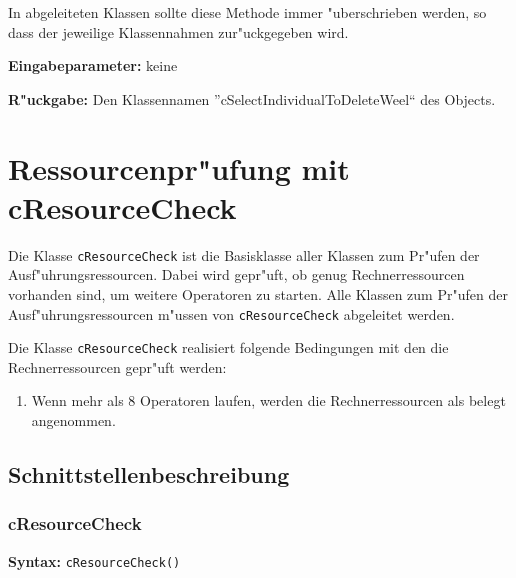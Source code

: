 In abgeleiteten Klassen sollte diese Methode immer "uberschrieben werden, so dass der jeweilige Klassennahmen zur"uckgegeben wird.

\bigskip\noindent
\textbf{Eingabeparameter:} keine

\bigskip\noindent
\textbf{R"uckgabe:} Den Klassennamen ''cSelectIndividualToDeleteWeel`` des Objects.


\section{Ressourcenpr"ufung mit cResourceCheck}
\label{secResourceCheck}

Die Klasse \verb|cResourceCheck| ist die Basisklasse aller Klassen zum Pr"ufen der Ausf"uhrungsressourcen. Dabei wird gepr"uft, ob genug Rechnerressourcen vorhanden sind, um weitere Operatoren zu starten. Alle Klassen zum  Pr"ufen der Ausf"uhrungsressourcen m"ussen von \verb|cResourceCheck| abgeleitet werden.


Die Klasse \verb|cResourceCheck| realisiert folgende Bedingungen mit den die Rechnerressourcen gepr"uft werden:
\begin{enumerate}
 \item Wenn mehr als 8 Operatoren laufen, werden die Rechnerressourcen als belegt angenommen.
\end{enumerate}

\subsection{Schnittstellenbeschreibung}


\subsubsection{cResourceCheck}

\textbf{Syntax:} \verb|cResourceCheck()| \\

